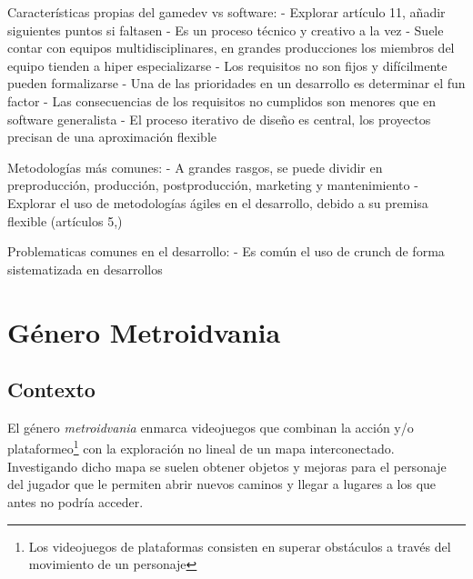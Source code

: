 Características propias del gamedev vs software:
- Explorar artículo 11, añadir siguientes puntos si faltasen
- Es un proceso técnico y creativo a la vez
- Suele contar con equipos multidisciplinares, en grandes producciones los miembros del equipo tienden a hiper especializarse
- Los requisitos no son fijos y difícilmente pueden formalizarse
- Una de las prioridades en un desarrollo es determinar el fun factor
- Las consecuencias de los requisitos no cumplidos son menores que en software generalista
- El proceso iterativo de diseño es central, los proyectos precisan de una aproximación flexible

Metodologías más comunes:
- A grandes rasgos, se puede dividir en preproducción, producción, postproducción, marketing y mantenimiento
- Explorar el uso de metodologías ágiles en el desarrollo, debido a su premisa flexible (artículos 5,)

Problematicas comunes en el desarrollo:
- Es común el uso de crunch de forma sistematizada en desarrollos

\section{Género Metroidvania}

\subsection{Contexto}

El género \textit{metroidvania} enmarca videojuegos que combinan la acción y/o plataformeo\footnote{Los videojuegos de plataformas consisten en superar obstáculos a través del movimiento de un personaje} con la exploración no lineal de un mapa interconectado. Investigando dicho mapa se suelen obtener objetos y mejoras para el personaje del jugador que le permiten abrir nuevos caminos y llegar a lugares a los que antes no podría acceder.

